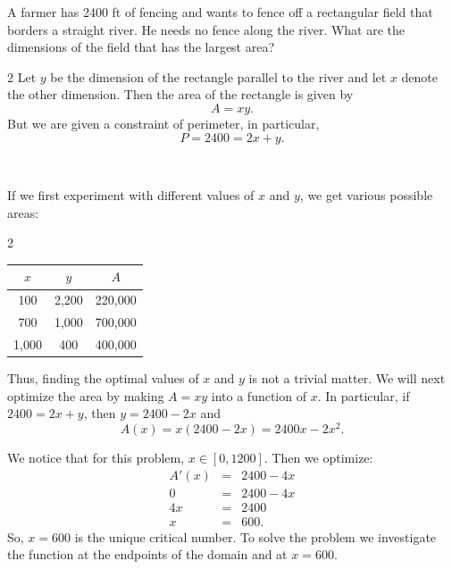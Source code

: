 \documentclass{book}
\begin{document}
\begin{Exam} A farmer has 2400 ft of fencing and wants to fence off a rectangular field that borders a straight river. He needs no fence along the river. What are the dimensions of the field that has the largest area?
\begin{multicols}{2}
Let $y$ be the dimension of the rectangle parallel to the river and let $x$ denote the other dimension. Then the area of the rectangle is given by \[A=xy.\] But we are given a constraint of perimeter, in particular,
\[P=2400 = 2x+y.\]\columnbreak

\mbox{}\\
\begin{center}
\end{center}
\end{multicols}
 If we first experiment with different values of $x$ and $y$, we get various possible areas:
 \begin{multicols}{2}
\begin{center}
\begin{tabular}{c|c|c}
$x$ & $y$ & $A$ \\ \hline
100 & 2,200 & 220,000 \\ 
700 & 1,000 & 700,000 \\ 
1,000 & 400 & 400,000 \\ 
\end{tabular}
\end{center}\columnbreak

Thus, finding the optimal values of $x$ and $y$ is not a trivial matter. We will next optimize the area by making $A=xy$ into a function of $x$. In particular, if $2400 = 2x+y$, then $y = 2400 - 2x$ and \[A(x) = x(2400-2x) = 2400x - 2x^2.\] 
\end{multicols}
\noindent We notice that for this problem, $x\in [0,1200]$. Then we optimize:
\begin{eqnarray*}
A'(x) &=& 2400 - 4x\\
0 &=& 2400-4x\\
4x &=& 2400\\
x &=& 600.
\end{eqnarray*}
So, $x=600$ is the unique critical number. To solve the problem we investigate the function at the endpoints of the domain and at $x=600$.\vspace{-15pt}


\end{Exam}
\end{document}
